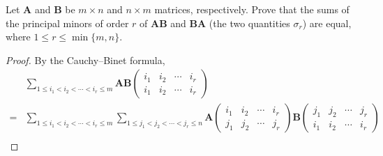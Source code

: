 \documentclass[12pt, a4paper, oneside]{book}
\begin{document}
\begin{theorem}
    Let $\mathbf{A}$ and $\mathbf{B}$ be $m \times n$ and $n \times m$ matrices, respectively. Prove that the sums of the principal minors of order $r$ of $\mathbf{A} \mathbf{B}$ and $\mathbf{B} \mathbf{A}$ (the two quantities $\sigma_r$) are equal, where $1 \leq r \leq \min \{m, n\}$.
    \begin{proof}
        By the Cauchy--Binet formula,
        \[
            \begin{aligned}
                  & \sum_{1 \leq i_1<i_2<\cdots<i_r \leq m} {\mathbf{A} \mathbf{B}}\left(\begin{array}{llll}
                                                                                                 i_1 & i_2 & \cdots & i_r \\
                                                                                                 i_1 & i_2 & \cdots & i_r
                                                                                             \end{array}\right)                                                               \\
                = & \sum_{1 \leq i_1<i_2<\cdots<i_r \leq m} \sum_{1 \leq j_1<j_2<\cdots<j_r \leq n} \mathbf{A}\left(\begin{array}{llll}
                                                                                                                            i_1 & i_2 & \cdots & i_r \\
                                                                                                                            j_1 & j_2 & \cdots & j_r
                                                                                                                        \end{array}\right) \mathbf{B}\left(\begin{array}{llll}
                                                                                                                                                               j_1 & j_2 & \cdots & j_r \\
                                                                                                                                                               i_1 & i_2 & \cdots & i_r
                                                                                                                                                           \end{array}\right) \\

\end{aligned}\]
\end{proof}
\end{theorem}
\end{document}
